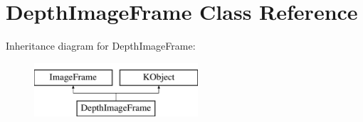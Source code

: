 \hypertarget{class_depth_image_frame}{\section{\-Depth\-Image\-Frame \-Class \-Reference}
\label{class_depth_image_frame}
}
\-Inheritance diagram for \-Depth\-Image\-Frame\-:\begin{figure}[H]
\begin{center}
\leavevmode
\includegraphics[height=2.000000cm]{class_depth_image_frame}
\end{center}
\end{figure}
